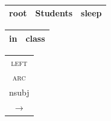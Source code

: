 \documentclass[t]{beamer}
\begin{document}
\begin{frame}
{\begin{varwidth}{2.3\linewidth}
{\begin{dependency}
\begin{deptext}[column sep=.7cm]
	\end{deptext}
	\end{dependency}
	\\
	\begin{tabular}{|l|l|l|}\hline
	\color{red} root & \color{red} Students & \color{red} sleep \\ \hline
	\end{tabular}
	\hfill
	\begin{tabular}{|l|l|}\hline
	\color{blue} in & \color{blue} class \\ \hline
	\end{tabular}
	}
	\begin{tabular}{c}\textsc{left}\\ \textsc{arc}\\{\footnotesize nsubj}\\$\rightarrow$\end{tabular}

    \vspace{5mm}
	

\end{varwidth}}
\end{frame}
\end{document}
